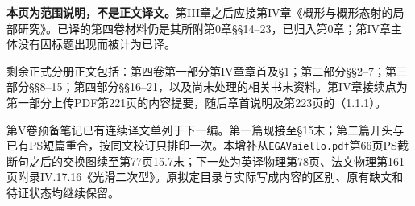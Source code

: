 \noindent\textbf{本页为范围说明，不是正文译文。}第III章之后应接第IV章《概形与概形态射的局部研究》。已译的第四卷材料仍是其所附第0章§§14--23，已归入第0章；第IV章主体没有因标题出现而被计为已译。

剩余正式分册正文包括：第四卷第一部分第IV章章首及§1；第二部分§§2--7；第三部分§§8--15；第四部分§§16--21，以及尚未处理的相关书末资料。第IV章接续点为第一部分上传PDF第221页的内容提要，随后章首说明及第223页的（1.1.1）。

第V卷预备笔记已有连续译文单列于下一编。第一篇现接至§15末；第二篇开头与已有PS短篇重合，按同文校订只排印一次。本增补从\texttt{EGAVaiello.pdf}第66页PS截断句之后的交换图续至第77页15.7末；下一处为英译物理第78页、法文物理第161页附录IV.17.16《光滑二次型》。原拟定目录与实际写成内容的区别、原有缺文和待证状态均继续保留。

